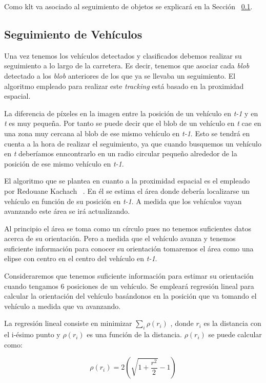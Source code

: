 Como \acrshort{klt} va asociado al seguimiento de objetos se explicará en la Sección ~\ref{sec.seguimiento}.


\subsection{Seguimiento de Vehículos}\label{sec.seguimiento}

Una vez tenemos los vehículos detectados y clasificados debemos realizar su seguimiento a lo largo de la carretera. Es decir, tenemos que asociar cada \textit{blob} detectado a los \textit{blob} anteriores de los que ya se llevaba un seguimiento. El algoritmo empleado para realizar este \textit{tracking} está basado en la proximidad espacial.

La diferencia de píxeles en la imagen entre la posición de un vehículo en \textit{t-1} y en \textit{t} es muy pequeña. Por tanto se puede decir que el blob de un vehículo en \textit{t} cae en una zona muy cercana al blob de ese mismo vehículo en \textit{t-1}. Esto se tendrá en cuenta a la hora de realizar el seguimiento, ya que cuando busquemos un vehículo en \textit{t} deberíamos enncontrarlo en un radio circular pequeño alrededor de la posición de ese mismo vehículo en \textit{t-1}. 

El algoritmo que se plantea en cuanto a la proximidad espacial es el empleado por Redouane Kachach ~\cite{redo_tesis}. En él se estima el área donde debería localizarse un vehículo en función de su posición en \textit{t-1}. A medida que los vehículos vayan avanzando este área se irá actualizando.

Al principio el área se toma como un círculo pues no tenemos suficientes datos acerca de su orientación. Pero a medida que el vehículo avanza y tenemos suficiente información para conocer su orientación tomaremos el área como una elipse con centro en el centro del vehículo en \textit{t-1}. 

Consideraremos que tenemos suficiente información para estimar su orientación cuando tengamos 6 posiciones de un vehículo. Se empleará regresión lineal para calcular la orientación del vehículo basándonos en la posición que va tomando el vehículo a medida que va avanzando. 

La regresión lineal consiste en minimizar $\sum_{i}\rho(r_i)$ , donde $r_i$  es la  distancia  con  el  i-ésimo  punto  y $\rho(r_i)$ es una función de la distancia. $\rho(r_i)$ se puede calcular como:

\begin{equation}\label{ec.regresion_lineal}
   \rho(r_i) = 2(\sqrt{1 +\frac{r^2}{2}} - 1) 
\end{equation}

